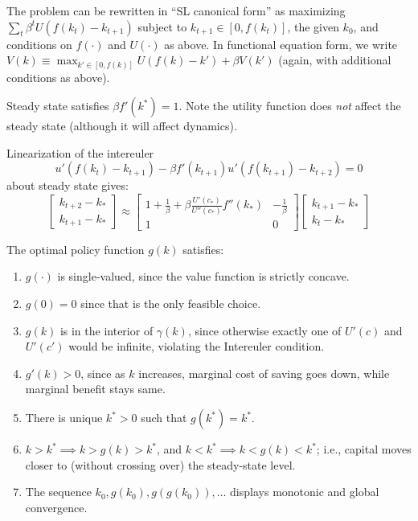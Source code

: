 \documentclass[8pt,letterpaper, landscape]{extarticle} %
\begin{document}
\begin{multicols}{3}
\begin{description}
The problem can be rewritten in ``SL canonical form'' as maximizing $ \sum_{t} \beta^t U(f(k_t) - k_{t+1}) $ subject to $ k_{t+1} \in [0, f(k_t)] $, the given $ k_0 $, and conditions on $ f(\cdot) $ and $ U(\cdot) $ as above. In functional equation form, we write $ V(k) \equiv \max_{k' \in [0, f(k)]} U(f(k) - k') + \beta V(k') $ (again, with additional conditions as above).

Steady state satisfies $ \beta f' (k^*) = 1 $. Note the utility function does \textit{not} affect the steady state (although it will affect dynamics).

Linearization of the intereuler
\[ u'(f(k_t) - k_{t+1}) - \beta f' (k_{t+1}) u' (f(k_{t+1}) - k_{t+2}) = 0 \]
about steady state gives:
$$
\begin{bmatrix}
k_{t+2} - k_* \\
k_{t+1} - k_*
\end{bmatrix}
\approx
\begin{bmatrix}
1 + \frac{1}{\beta} + \beta \frac{U'(c_*)}{U''(c_*)} f''(k_*) & -\frac{1}{\beta} \\
1 & 0
\end{bmatrix}
\begin{bmatrix}
k_{t+1} - k_* \\
k_{t} - k_*
\end{bmatrix}
 $$

The optimal policy function $ g(k) $ satisfies:
\begin{enumerate}
\item $ g(\cdot) $ is single-valued, since the value function is strictly concave.
\item $ g(0) = 0 $ since that is the only feasible choice.
\item $ g(k) $ is in the interior of $ \gamma(k) $, since otherwise exactly one of $ U'(c) $ and $ U'(c') $ would be infinite, violating the Intereuler condition.
\item $ g'(k) > 0 $, since as $ k $ increases, marginal cost of saving goes down, while marginal benefit stays same.
\item There is unique $ k^* >0$ such that $ g(k^*) = k^* $.
\item $ k > k^* \implies k > g(k) > k^* $, and $ k < k^* \implies k < g(k) < k^* $; i.e., capital moves closer to (without crossing over) the steady-state level.
\item The sequence $ k_0, g(k_0), g(g(k_0)), \dotsc $ displays monotonic and global convergence.
\end{enumerate}


\end{description}
\end{multicols}
\end{document}
